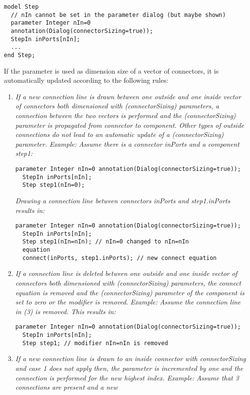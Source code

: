 \begin{example}
\begin{lstlisting}[language=modelica]
model Step
  // nIn cannot be set in the parameter dialog (but maybe shown)
  parameter Integer nIn=0
  annotation(Dialog(connectorSizing=true));
  StepIn inPorts[nIn];
  ...
end Step;
\end{lstlisting}
If the parameter is used as dimension size of a vector of
connectors, it is automatically updated according to the following
rules:
\begin{enumerate}
\item
  \emph{If a new connection line is drawn between one outside and one
  inside vector of connectors both dimensioned with (connectorSizing)
  parameters, a connection between the two vectors is performed and the
  (connectorSizing) parameter is propagated from connector to component.
  Other types of outside connections do not lead to an automatic update
  of a (connectorSizing) parameter. Example:} \emph{Assume there is a
  connector inPorts and a component step1:}
\begin{lstlisting}[language=modelica]
  parameter Integer nIn=0 annotation(Dialog(connectorSizing=true));
  StepIn inPorts[nIn];
  Step step1(nIn=0);
\end{lstlisting}
  \emph{Drawing a connection line between connectors inPorts and
  step1.inPorts results in:}
\begin{lstlisting}[language=modelica]
  parameter Integer nIn=0 annotation(Dialog(connectorSizing=true));
  StepIn inPorts[nIn];
  Step step1(nIn=nIn); // nIn=0 changed to nIn=nIn
  equation
  connect(inPorts, step1.inPorts); // new connect equation
\end{lstlisting}
\item
  \emph{If a connection line is deleted between one outside and one
  inside vector of connectors both dimensioned with (connectorSizing)
  parameters, the connect equation is removed and the (connectorSizing)
  parameter of the component is set to zero or the modifier is removed}.
  \emph{Example:} \emph{Assume the connection line in (3) is removed.
  This results in:}
\begin{lstlisting}[language=modelica]
  parameter Integer nIn=0 annotation(Dialog(connectorSizing=true));
  StepIn inPorts[nIn];
  Step step1; // modifier nIn=nIn is removed
\end{lstlisting}
\item
  \emph{If a new connection line is drawn to an inside connector with
  connectorSizing and case 1 does not apply then, the parameter is
  incremented by one and the connection is performed for the new highest
  index. Example:} \emph{Assume that 3 connections are present and a new
}
\end{enumerate}
\end{example}

